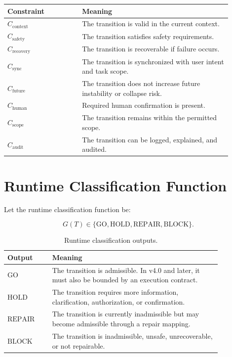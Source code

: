 \documentclass[11pt,a4paper]{article}
\newcommand{\GO}{\mathrm{GO}}
\newcommand{\HOLD}{\mathrm{HOLD}}
\newcommand{\REPAIR}{\mathrm{REPAIR}}
\newcommand{\BLOCK}{\mathrm{BLOCK}}
\begin{document}
\begin{longtable}{p{0.30\linewidth} p{0.60\linewidth}}
\toprule
\textbf{Constraint} & \textbf{Meaning} \\
\midrule
\(C_{\mathrm{context}}\) & The transition is valid in the current context. \\
\(C_{\mathrm{safety}}\) & The transition satisfies safety requirements. \\
\(C_{\mathrm{recovery}}\) & The transition is recoverable if failure occurs. \\
\(C_{\mathrm{sync}}\) & The transition is synchronized with user intent and task scope. \\
\(C_{\mathrm{future}}\) & The transition does not increase future instability or collapse risk. \\
\(C_{\mathrm{human}}\) & Required human confirmation is present. \\
\(C_{\mathrm{scope}}\) & The transition remains within the permitted scope. \\
\(C_{\mathrm{audit}}\) & The transition can be logged, explained, and audited. \\
\bottomrule
\end{longtable}

\section{Runtime Classification Function}

Let the runtime classification function be:

\[
G(T)
\in
\{\GO,\HOLD,\REPAIR,\BLOCK\}.
\]

\begin{table}[H]
\centering
\caption{Runtime classification outputs.}
\begin{tabular}{p{0.18\linewidth} p{0.68\linewidth}}
\toprule
\textbf{Output} & \textbf{Meaning} \\
\midrule
\(\GO\) & The transition is admissible. In v4.0 and later, it must also be bounded by an execution contract. \\
\(\HOLD\) & The transition requires more information, clarification, authorization, or confirmation. \\
\(\REPAIR\) & The transition is currently inadmissible but may become admissible through a repair mapping. \\
\(\BLOCK\) & The transition is inadmissible, unsafe, unrecoverable, or not repairable. \\
\bottomrule
\end{tabular}
\end{table}
\end{document}
